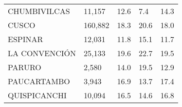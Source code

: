 \begin{tabular}{lllll}
	\cellcolor[HTML]{FF5050}CHUMBIVILCAS                           & 11,157                                                                & 12.6                                                                             & 7.4                                                                         & 14.3                                                                                \\
	\cellcolor[HTML]{FF5050}CUSCO                                  & 160,882                                                               & 18.3                                                                             & 20.6                                                                        & 18.0                                                                                \\
	\cellcolor[HTML]{FF5050}ESPINAR                                & 12,031                                                                & 11.8                                                                             & 15.1                                                                        & 11.7                                                                                \\
	\cellcolor[HTML]{FF5050}LA CONVENCIÓN                          & 25,133                                                                & 19.6                                                                             & 22.7                                                                        & 19.5                                                                                \\
	\cellcolor[HTML]{FF5050}PARURO                                 & 2,580                                                                 & 14.0                                                                             & 19.5                                                                        & 12.9                                                                                \\
	\cellcolor[HTML]{FF5050}PAUCARTAMBO                            & 3,943                                                                 & 16.9                                                                             & 13.7                                                                        & 17.4                                                                                \\
	\cellcolor[HTML]{FF5050}QUISPICANCHI                           & 10,094                                                                & 16.5                                                                             & 14.6                                                                        & 16.8                                                                                \\

\end{tabular}
